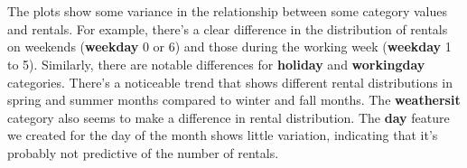 \documentclass[11pt]{article}
\begin{document}
    \begin{center}
    \end{center}
    { \hspace*{\fill} \\}
    
    \begin{center}
    \end{center}
    { \hspace*{\fill} \\}
    
    \begin{center}
    \end{center}
    { \hspace*{\fill} \\}
    
    \begin{center}
    \end{center}
    { \hspace*{\fill} \\}
    
    \begin{center}
    \end{center}
    { \hspace*{\fill} \\}
    
    \begin{center}
    \end{center}
    { \hspace*{\fill} \\}
    
    \begin{center}
    \end{center}
    { \hspace*{\fill} \\}
    
    The plots show some variance in the relationship between some category
values and rentals. For example, there's a clear difference in the
distribution of rentals on weekends (\textbf{weekday} 0 or 6) and those
during the working week (\textbf{weekday} 1 to 5). Similarly, there are
notable differences for \textbf{holiday} and \textbf{workingday}
categories. There's a noticeable trend that shows different rental
distributions in spring and summer months compared to winter and fall
months. The \textbf{weathersit} category also seems to make a difference
in rental distribution. The \textbf{day} feature we created for the day
of the month shows little variation, indicating that it's probably not
predictive of the number of rentals.
\end{document}
